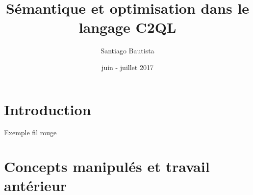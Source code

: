 \documentclass{beamer}
\begin{document}
\author{Santiago Bautista}
\title{Sémantique et optimisation dans le  langage C2QL}
\date{juin - juillet 2017}



\begin{frame}
\titlepage
\end{frame}

\section{Introduction}
\begin{frame}
\end{frame}

\begin{frame}
\end{frame}

\begin{frame}
\tableofcontents
\end{frame}

\begin{frame}{Exemple fil rouge}
\end{frame}


\section{Concepts manipulés et travail antérieur}
\end{document}

